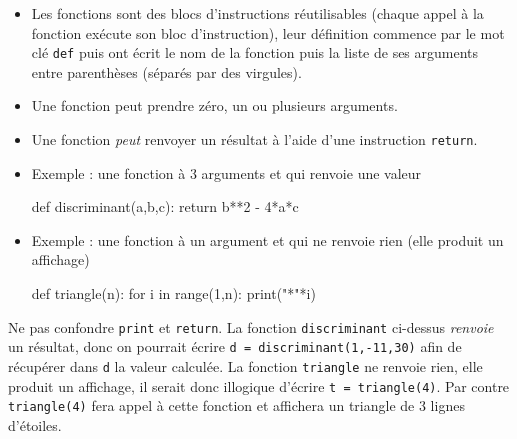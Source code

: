 \documentclass[11pt,a4paper]{article}
\begin{document}
\begin{tcolorbox}[left=0cm,title=\bf{\faPython \; Fonctions},colbacktitle=cfond]
\begin{itemize}
\item[\textbullet] Les fonctions sont des blocs d'instructions réutilisables (chaque appel à la fonction exécute son bloc d'instruction), leur définition commence par le mot clé {\tt def} puis ont écrit le nom de la fonction puis la liste de ses arguments entre parenthèses (séparés par des virgules).
\item[\textbullet] Une fonction peut prendre zéro, un ou plusieurs arguments.
\item[\textbullet] Une fonction \textit{peut} renvoyer un résultat à l'aide d'une instruction {\tt return}.
\item[\textbullet] Exemple : une fonction à 3 arguments et qui renvoie une valeur 
\begin{python}
def discriminant(a,b,c):
	return b**2 - 4*a*c
\end{python}
\item[\textbullet] Exemple : une fonction à un argument et qui ne renvoie rien (elle produit un affichage)
\begin{python}
def triangle(n):
	for i in range(1,n):
		print("*"*i) 
\end{python}
\end{itemize}
{\small \danger} Ne pas confondre  {\tt print} et {\tt return}. La fonction {\tt discriminant} ci-dessus \textit{renvoie} un résultat, donc on pourrait écrire {\tt d = discriminant(1,-11,30)} afin de récupérer dans {\tt d} la valeur calculée. La fonction {\tt triangle} ne renvoie rien, elle produit un affichage, il serait donc illogique d'écrire {\tt t~=~triangle(4)}. Par contre {\tt triangle(4)} fera appel à cette fonction et affichera un triangle de 3 lignes d'étoiles.
\end{tcolorbox}
\end{document}
